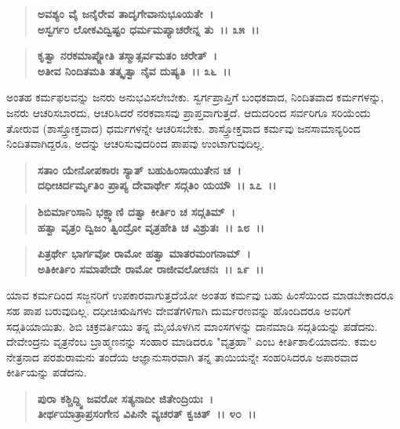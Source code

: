 \begin{verse}
\textbf{ಅವಶ್ಯಂ ವೈ ಜನೈರೇವ ತಾದೃಗೇವಾನುಭೂಯತೇ~।}\\\textbf{ಅಸ್ವರ್ಗಂ ಲೋಕವಿದ್ವಿಷ್ಟಂ ಧರ್ಮಮಪ್ಯಾಚರೇನ್ನ ತು~।। ೩೫~।। }
\end{verse}

\begin{verse}
\textbf{ಕೃತ್ವಾ ನರಕಮಾಪ್ನೋತಿ ತಸ್ಮಾತ್ಸರ್ವಮತಂ ಚರೇತ್~।}\\\textbf{ಅತೀವ ನಿಂದಿತಮತಿ ತತ್ಕೃತ್ವಾ ನೈವ ದುಷ್ಯತಿ~।। ೩೬~।।}
\end{verse}

ಅಂತಹ ಕರ್ಮಫಲವನ್ನು ಜನರು ಅನುಭವಿಸಲೇಬೇಕು. ಸ್ವರ್ಗಪ್ರಾಪ್ತಿಗೆ ಬಂಧಕವಾದ, ನಿಂದಿತವಾದ ಕರ್ಮಗಳನ್ನು, ಜನರು ಆಚರಿಸಬಾರದು, ಆಚರಿಸಿದರೆ ನರಕವಾಸವು ಪ್ರಾಪ್ತವಾಗುತ್ತದೆ. ಆದುದರಿಂದ ಸರ್ವರಿಗೂ ಸರಿಯೆಂದು ತೋರುವ (ಶಾಸ್ತ್ರೋಕ್ತವಾದ) ಧರ್ಮಗಳನ್ನೇ ಆಚರಿಸಬೇಕು. ಶಾಸ್ತ್ರೋಕ್ತವಾದ ಕರ್ಮವು ಜನಸಾಮಾನ್ಯರಿಂದ ನಿಂದಿತವಾಗಿದ್ದರೂ, ಅದನ್ನು ಆಚರಿಸುವುದರಿಂದ ಪಾಪವು ಉಂಟಾಗುವುದಿಲ್ಲ.

\begin{verse}
\textbf{ಸತಾಂ ಯೇನೋಪಕಾರಃ ಸ್ಯಾತ್ ಬಹುಹಿಂಸಾಯುತೇನ ಚ~।}\\\textbf{ದಧೀಚಿರ್ದರ್ಮೃತಿಂ ಪ್ರಾಪ್ಯ ದೇವಾರ್ಥೇ ಸದ್ಗತಿಂ ಯಯೌ~।। ೩೭~।। }
\end{verse}

\begin{verse}
\textbf{ಶಿಬಿರ್ಮಾಂಸಾನಿ ಭಕ್ಷ್ಯಾಣಿ ದತ್ವಾ ಕೀರ್ತಿಂ ಚ ಸದ್ಗತಿಮ್~।}\\\textbf{ಹತ್ವಾ ವೃತ್ರಂ ದ್ವಿಜಂ ತ್ವಿಂದ್ರೋ ವೃತ್ರಹೇತಿ ಚ ವಿಶ್ರುತಃ~।। ೩೮~।। }
\end{verse}

\begin{verse}
\textbf{ಪಿತ್ರರ್ಥೇ ಭಾರ್ಗವೋ ರಾಮೋ ಹತ್ವಾ ಮಾತರಮಂಗನಾಮ್~।}\\\textbf{ಅತಿಕೀರ್ತಿಂ ಸಮಾಪೇದೇ ರಾಮೋ ರಾಜೀವಲೋಚನಃ~।। ೩೯~।।}
\end{verse}

ಯಾವ ಕರ್ಮದಿಂದ ಸಜ್ಜನರಿಗೆ ಉಪಕಾರವಾಗುತ್ತದೆಯೋ ಅಂತಹ ಕರ್ಮವು ಬಹು ಹಿಂಸೆಯಿಂದ ಮಾಡಬೇಕಾದರೂ ಸಹ ಪಾಪ ಬರುವುದಿಲ್ಲ. ದಧೀಚಿಋಷಿಗಳು ದೇವತೆಗಳಿಗಾಗಿ ದುರ್ಮರಣವನ್ನು ಹೊಂದಿದರೂ ಅವರಿಗೆ ಸದ್ಗತಿಯಾಯಿತು. ಶಿಬಿ ಚಕ್ರವರ್ತಿಯು ತನ್ನ ಮೈಯೊಳಗಿನ ಮಾಂಸಗಳನ್ನು ದಾನಮಾಡಿ ಸದ್ಗತಿಯನ್ನು ಪಡೆದನು. ದೇವೇಂದ್ರನು ವೃತ್ರನೆಂಬ ಬ್ರಾಹ್ಮಣನನ್ನು ಸಂಹಾರ ಮಾಡಿದರೂ "ವೃತ್ರಹಾ” ಎಂಬ ಕೀರ್ತಿಶಾಲಿಯಾದನು. ಕಮಲ ನೇತ್ರನಾದ ಪರಶುರಾಮನು ತಂದೆಯ ಆಜ್ಞಾನುಸಾರವಾಗಿ ತನ್ನ ತಾಯಿಯನ್ನೇ ಸಂಹರಿಸಿದರೂ ಅಪಾರವಾದ ಕೀರ್ತಿಯನ್ನು ಪಡೆದನು.

\begin{verse}
\textbf{ಪುರಾ ಕಶ್ಚಿದ್ದ್ವಿ ಜವರೋ ಸತ್ಯನಾದೀ ಜಿತೇಂದ್ರಿಯಃ~।}\\\textbf{ತೀರ್ಥಯಾತ್ರಾಪ್ರಸಂಗೇನ ವಿಪಿನೇ ವ್ಯಚರತ್ ಕ್ವಚಿತ್~।। ೪೦~।। }
\end{verse}

